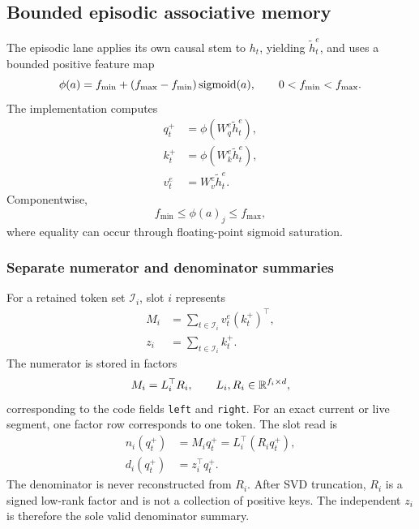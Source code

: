 \subsection{Bounded episodic associative memory}
\label{subsec:episodic-memory}

The episodic lane applies its own causal stem to \(h_t\), yielding
\(\widetilde h_t^e\), and uses a bounded positive feature map
\begin{equation}
  \phi(a)
  =
  f_{\min}+(f_{\max}-f_{\min})\operatorname{sigmoid}(a),
  \qquad
  0<f_{\min}<f_{\max}.
  \label{eq:positive-feature-map}
\end{equation}
The implementation computes
\begin{align}
  q_t^+&=\phi(W_q^e\widetilde h_t^e), \\
  k_t^+&=\phi(W_k^e\widetilde h_t^e), \\
  v_t^e&=W_v^e\widetilde h_t^e.
  \label{eq:episodic-projections}
\end{align}
Componentwise,
\begin{equation}
  f_{\min}\leq \phi(a)_j\leq f_{\max},
  \label{eq:feature-bounds}
\end{equation}
where equality can occur through floating-point sigmoid saturation.

\subsubsection{Separate numerator and denominator summaries}

For a retained token set \(\mathcal I_i\), slot \(i\) represents
\begin{align}
  M_i
    &=\sum_{t\in\mathcal I_i}
      v_t^e(k_t^+)^\top, \\
  z_i
    &=\sum_{t\in\mathcal I_i}k_t^+.
  \label{eq:slot-moments}
\end{align}
The numerator is stored in factors
\begin{equation}
  M_i
  =
  L_i^\top R_i,
  \qquad
  L_i,R_i\in\mathbb{R}^{f_i\times d},
  \label{eq:slot-factorization}
\end{equation}
corresponding to the code fields \texttt{left} and \texttt{right}.  For an
exact current or live segment, one factor row corresponds to one token.  The
slot read is
\begin{align}
  n_i(q_t^+)
    &=M_iq_t^+
      =L_i^\top(R_iq_t^+), \\
  d_i(q_t^+)
    &=z_i^\top q_t^+.
  \label{eq:slot-read}
\end{align}
The denominator is never reconstructed from \(R_i\).  After SVD truncation,
\(R_i\) is a signed low-rank factor and is not a collection of positive keys.
The independent \(z_i\) is therefore the sole valid denominator summary.

